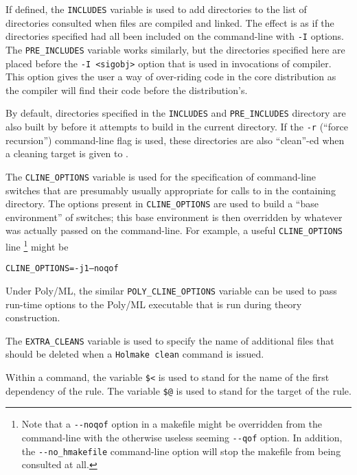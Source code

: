 If defined, the \texttt{INCLUDES} variable is used to add directories to the list of directories consulted when files are compiled and linked.
The effect is as if the directories specified had all been included on the command-line with \texttt{-I} options.
The \texttt{PRE\_INCLUDES} variable works similarly, but the directories specified here are placed before the \mbox{\texttt{-I <sigobj>}} option that is used in invocations of compiler.
This option gives the user a way of over-riding code in the core distribution as the compiler will find their code before the distribution's.

By default, directories specified in the \texttt{INCLUDES} and \texttt{PRE\_INCLUDES} directory are also built by \holmake{} before it attempts to build in the current directory.
If the \texttt{-r} (``force recursion'') command-line flag is used, these directories are also ``clean''-ed when a cleaning target is given to \holmake{}.

%
The \texttt{CLINE\_OPTIONS} variable is used for the specification of command-line switches that are presumably usually appropriate for calls to \holmake{} in the containing directory.
The options present in \texttt{CLINE\_OPTIONS} are used to build a ``base environment'' of switches; this base environment is then overridden by whatever was actually passed on the command-line.
For example, a useful \texttt{CLINE\_OPTIONS} line%
\footnote{Note that a \texttt{-{}-noqof} option in a makefile might be overridden from the command-line with the otherwise useless seeming \texttt{-{}-qof} option.
In addition, the \texttt{-{}-no\_hmakefile} command-line option will stop the makefile from being consulted at all.} %
might be
\begin{alltt}
    CLINE_OPTIONS = -j1 --noqof
\end{alltt}
Under Poly/ML, the similar \texttt{POLY\_CLINE\_OPTIONS} variable can be used to pass run-time options to the Poly/ML executable that is run during theory construction.


%
The \texttt{EXTRA\_CLEANS} variable is used to
specify the name of additional files that should be deleted when a
\texttt{Holmake clean} command is issued.

Within a command, the variable \texttt{\$<} is used to stand for the
name of the first dependency of the rule.  The variable \texttt{\$@} is
used to stand for the target of the rule.

